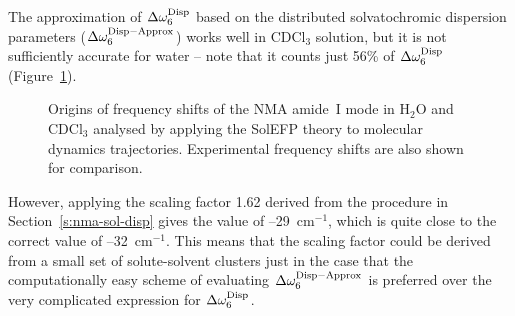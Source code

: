 \documentclass[a4paper,titlepage,twoside,fleqn,12pt]{book}
\begin{document}
\begin{refsection}
The approximation of $\Delta\omega^{\rm Disp}_6$
based on the distributed
solvatochromic dispersion parameters ($\Delta\omega^{\rm Disp-Approx}_6$)
works
well in CDCl$_3$ solution, but it is not sufficiently accurate for
water -- note that it counts just 56\% of $\Delta\omega^{\rm Disp}_6$
(Figure~\ref{f:nma-solefp-md}).
%
\begin{figure}[t!]
\centering
\setlength\fboxsep{0.4pt}
\setlength\fboxrule{0.5pt}
\caption{
Origins of frequency shifts of the NMA amide~I mode 
in H$_2$O and CDCl$_3$ analysed by applying 
the SolEFP theory to molecular dynamics trajectories. 
Experimental frequency shifts are also shown for comparison.
\label{f:nma-solefp-md}}
\end{figure}
%
However, applying the scaling factor 1.62 derived from the
procedure in Section~\ref{s:nma-sol-disp} 
gives the value of --29~cm$^{-1}$, which
is quite close to the correct value of --32~cm$^{-1}$. This means
that the scaling factor could be derived from a small set of
solute\hyp{}solvent clusters just in the case that the computationally
easy scheme of evaluating $\Delta\omega^{\rm Disp-Approx}_6$ is preferred over the very
complicated expression for $\Delta\omega^{\rm Disp}_6$.


\end{refsection}
\end{document}
